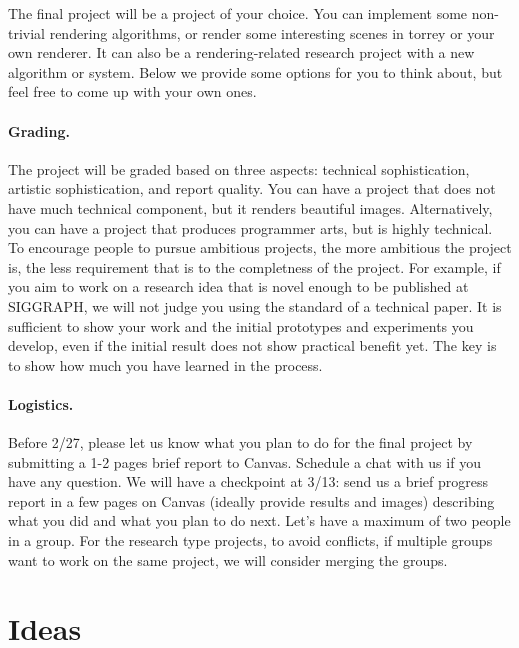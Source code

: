 




The final project will be a project of your choice. You can implement some non-trivial rendering algorithms, or render some interesting scenes in torrey or your own renderer. It can also be a rendering-related research project with a new algorithm or system. 
Below we provide some options for you to think about, but feel free to come up with your own ones.

\paragraph{Grading.} 
The project will be graded based on three aspects: technical sophistication, artistic sophistication, and report quality.
You can have a project that does not have much technical component, but it renders beautiful images.
Alternatively, you can have a project that produces programmer arts, but is highly technical. 
To encourage people to pursue ambitious projects, the more ambitious the project is, the less requirement that is to the completness of the project. 
For example, if you aim to work on a research idea that is novel enough to be published at SIGGRAPH, we will not judge you using the standard of a technical paper.
It is sufficient to show your work and the initial prototypes and experiments you develop, even if the initial result does not show practical benefit yet.
The key is to show how much you have learned in the process.

\paragraph{Logistics.}
Before 2/27, please let us know what you plan to do for the final project by submitting a 1-2 pages brief report to Canvas.
Schedule a chat with us if you have any question. 
We will have a checkpoint at 3/13: send us a brief progress report in a few pages on Canvas (ideally provide results and images) describing what you did and what you plan to do next.
Let's have a maximum of two people in a group. 
For the research type projects, to avoid conflicts, if multiple groups want to work on the same project, we will consider merging the groups. 

\section{Ideas}

